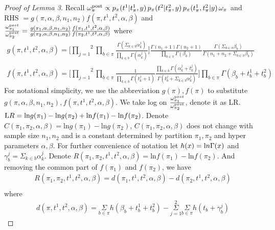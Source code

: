 \documentclass[aoas,preprint]{imsart}
\begin{document}
\begin{proof}[Proof of Lemma 3]
Recall $ \omega^{\rm post}_\pi \propto 
 p_\pi(t^1 | t^1_{\pi},y)\, p_\pi(t^2|  t^2_{\pi},y )
 \, p_\pi( t^1_{\pi}, t^2_{\pi} | y ) \, \omega_\pi$ and \\
 RHS $=  g(\pi, \alpha, \beta, n_1, n_2) f(\pi, t^1, t^2, \alpha, \beta)$ and $\frac{\omega_{\pi_1}^{\text post}}{\omega_{\pi_2}^{\text post}} = \frac{g(\pi_1, \alpha, \beta, n_1, n_2)}{g(\pi_2, \alpha, \beta, n_1, n_2)}\frac{f(\pi_1, t^1, t^2, \alpha, \beta)}{f(\pi_2, t^1, t^2, \alpha, \beta)}$
 where \begin{eqnarray*}
 g(\pi, t^1, t^2, \alpha, \beta) = \big[ \overset{2}{\underset{j = 1}{\prod}}\underset{b\in \pi}\prod \frac{\Gamma(\Sigma_{k\in b} \alpha_k^j)}{\prod_{k\in b} \Gamma(\alpha_k^j)} \big ] \frac{\Gamma(n_1 + 1) \Gamma(n_2 + 1)}{\prod_{b\in \pi} \Gamma(\beta_b)} \frac{\Gamma(\Sigma_{b \in \pi} \beta_b)}{\Gamma(n_1 + n_2 + \Sigma_{b\in\pi} \beta_b)}\\
f(\pi, t^1, t^2, \alpha, \beta) = \big[ \overset{2}{\underset{j = 1}{\prod}}\underset{b\in \pi}\prod \frac{1}{\prod_{k \in b}\Gamma(t_k^j + 1)}\frac{\prod_{k \in b}\Gamma(\alpha_k^j + t_k^j)}{\Gamma(t_b^j + \Sigma_{k\in b}\alpha_k^j)}\big ] \underset{b\in \pi}\prod \Gamma(\beta_b + t_b^1 + t_b^2) 
\end{eqnarray*}
For notational simplicity, we use the abbreviation $g(\pi), f(\pi)$ to substitute \\
$g(\pi, \alpha, \beta, n_1, n_2),f(\pi, t^1, t^2, \alpha, \beta)$.  We take log on $\frac{\omega_{\pi_1}^{\text post}}{\omega_{\pi_2}^{\text post}}$, denote it as LR. $\text LR = \text{ln}g(\pi_1) - \text{ln}g(\pi_2) + \text{ln}f(\pi_1) - \text{ln}f(\pi_2)$. Denote $C(\pi_1, \pi_2, \alpha, \beta) = \text{ln}g(\pi_1) - \text{ln}g(\pi_2)$, $C(\pi_1, \pi_2, \alpha, \beta)$ does not change with sample size $n_1, n_2$ and is a constant determined by partition $\pi_1, \pi_2$ and hyper parameters $\alpha, \beta$.  For further convenience of notation let $h(x) = \text ln\Gamma(x)$ and $\gamma_b^j = \Sigma_{k\in b} \alpha_k^j$. Denote $R(\pi_1, \pi_2, t^1, t^2, \alpha, \beta) = \text{ln}f(\pi_1) - \text{ln}f(\pi_2)$. And removing the common part of $f(\pi_1)$ and $f(\pi_2)$, we have 
\begin{eqnarray*}
R(\pi_1, \pi_2, t^1, t^2, \alpha, \beta) = d(\pi_1, t^1, t^2, \alpha, \beta) - d(\pi_2, t^1, t^2, \alpha, \beta)\\
\end{eqnarray*}
where
\begin{eqnarray*}
d(\pi, t^1, t^2, \alpha, \beta) = \underset{b\in \pi}\Sigma h(\beta_b + t_b^1 + t_b^2) - \overset{2}{\underset{j = 1}{\Sigma}} \underset{b\in \pi}\Sigma h(t_b + \gamma_b^j)
\end{eqnarray*}



\end{proof}
\end{document}
